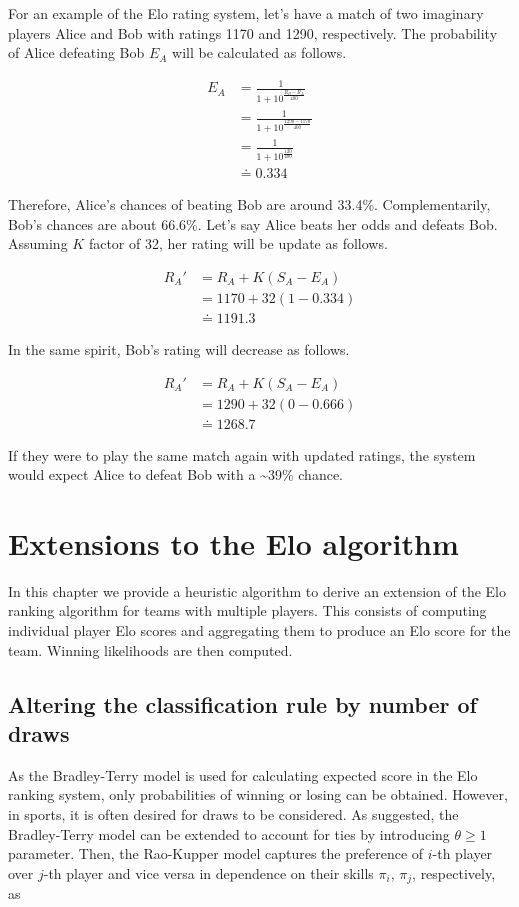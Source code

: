 \examplespace
\begin{example}
For an example of the Elo rating system, let's have a match of two imaginary players Alice and Bob with ratings 1170 and 1290, respectively. The probability of Alice defeating Bob $E_A$ will be calculated as follows.

\begin{align*}
E_A &= \frac{1}{1+10^{\frac{R_B-R_A}{400}}} \\
&= \frac{1}{1+10^{\frac{1290-1170}{400}}} \\ 
&= \frac{1}{1+10^{\frac{120}{400}}} \\[0.5em]
&\doteq 0.334
\end{align*}

Therefore, Alice's chances of beating Bob are around 33.4\%. Complementarily, Bob's chances are about 66.6\%. Let's say Alice beats her odds and defeats Bob. Assuming $K$ factor of 32, her rating will be update as follows. 

\begin{align*}
R_A' &= R_A + K(S_A - E_A) \\
&= 1170 + 32(1 - 0.334) \\
&\doteq 1191.3
\end{align*}

In the same spirit, Bob's rating will decrease as follows.

\begin{align*}
R_A' &= R_A + K(S_A - E_A) \\
&= 1290 + 32(0 - 0.666) \\
&\doteq 1268.7
\end{align*}

If they were to play the same match again with updated ratings, the system would expect Alice to defeat Bob with a \textasciitilde 39\% chance.
\end{example}

\section{Extensions to the Elo algorithm}
\label{section:elo_for_teams}
In this chapter we provide a heuristic algorithm to derive an extension of the Elo ranking algorithm for teams with multiple players. This consists of computing individual player Elo scores and aggregating them to produce an Elo score for the team. Winning likelihoods are then computed.

\subsection{Altering the classification rule by number of draws}
As the Bradley-Terry model is used for calculating expected score in the Elo ranking system, only probabilities of winning or losing can be obtained. However, in sports, it is often desired for draws to be considered. As \citet{RaoTiesPairedComparisonExperiments1967} suggested, the Bradley-Terry model can be extended to account for ties by introducing $\theta \geq 1$ parameter. Then, the Rao-Kupper model captures the preference of $i$-th player over $j$-th player and vice versa in dependence on their skills $\pi_i$, $\pi_j$, respectively, as

